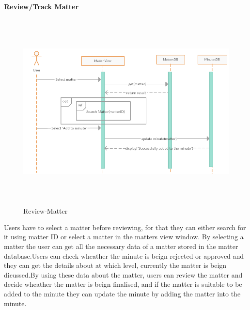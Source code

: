 \documentclass[a4paper,beamer]{article}
\begin{document}
		\textbf{Review/Track Matter}\newline
		\begin{figure}[h!]
			\begin{center}
			\includegraphics[width=6in,height=4in]{img/seq-review-matter}
			\end{center}
			\caption{Review-Matter}
			\label{fig:review-matter}
		\end{figure}
		        
		Users have to select a matter before reviewing, for that they can either search for it using matter ID or select a matter in the matters view window. By selecting a matter the user can get all the necessary data of a matter stored in the matter database.Users can check wheather the minute is beign rejected or approved and they can get the details about at which level, currently the matter is beign dicussed.By using these data about the matter, users can review the matter and decide wheather the matter is beign finalised, and if the matter is suitable to be added to the minute they can update the minute by adding the matter into the minute.
		
		\newpage
	
\end{document}
